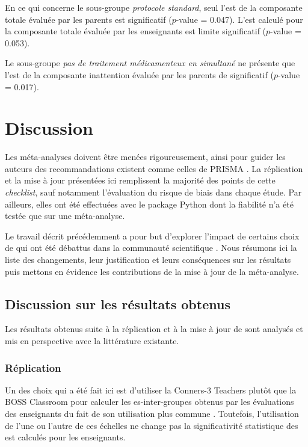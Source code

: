En ce qui concerne le sous-groupe \emph{protocole standard}, seul l'\gls{est} de la composante totale évaluée par les parents est significatif ($p$-value = 0.047). 
L'\gls{est} calculé pour la composante totale évaluée par les enseignants est limite significatif ($p$-value = 0.053).

Le sous-groupe \emph{pas de traitement médicamenteux en simultané} ne présente que l'\gls{est} de la composante inattention évaluée par les parents de 
significatif ($p$-value = 0.017).

\section{Discussion} 

Les méta-analyses doivent être menées rigoureusement, ainsi pour guider les auteurs des recommandations existent comme celles de PRISMA \citep{Moher2009}.
La réplication et la mise à jour présentées ici remplissent la majorité des points de cette \textit{checklist}, sauf notamment l'évaluation du risque de biais dans chaque étude.
Par ailleurs, elles ont été effectuées avec le package Python dont la fiabilité n'a été testée que sur une méta-analyse.
 
Le travail décrit précédemment a pour but d'explorer l'impact de certains choix de \citet{Cortese2016} qui ont été débattus dans la communauté scientifique 
\citep{Micoulaud2016}. Nous résumons ici la liste des changements, leur justification et leurs conséquences sur les résultats puis mettons en évidence 
les contributions de la mise à jour de la méta-analyse. 

\subsection{Discussion sur les résultats obtenus} \label{replication_and_update}

Les résultats obtenus suite à la réplication et à la mise à jour de \citet{Cortese2016} sont analysés et mis en perspective avec la littérature existante.

\subsubsection{Réplication}

Un des choix qui a été fait ici est d'utiliser la Conners-3 Teachers \citep{Conners2008} plutôt que la BOSS Classroom \citep{Shapiro2010} 
pour calculer les \gls{es}-inter-groupes obtenus par les évaluations des enseignants du fait de son utilisation plus commune \citep{Christiansen2014, Bluschke2016}.
Toutefois, l'utilisation de l'une ou l'autre de ces échelles ne change pas la significativité statistique des \gls{est} calculés pour les enseignants. 

